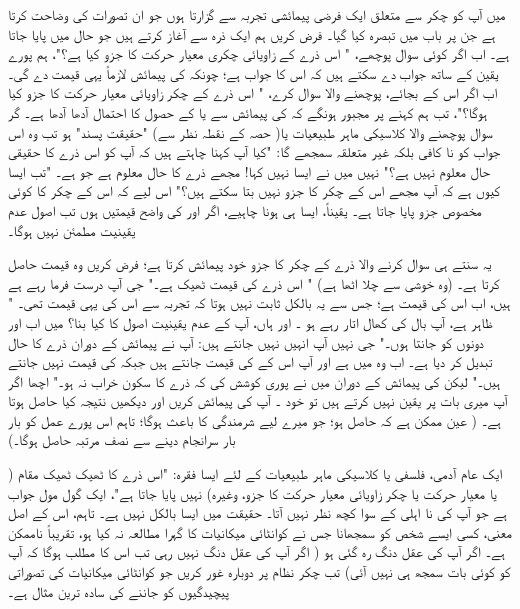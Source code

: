 میں آپ کو     چکر سے متعلق ایک فرضی  پیمائشی  تجربہ  سے گزارتا ہوں جو  ان تصورات  کی وضاحت کرتا ہے جن پر باب   میں  تبصرہ  کیا گیا۔ فرض کریں ہم  ایک ذرہ سے آغاز کرتے ہیں جو   حال میں پایا جاتا ہے۔ اب اگر کوئی سوال  پوچھے، " اس ذرے کے  زاویائی چکری معیار حرکت کا     جزو  کیا ہے؟"،   ہم پورے یقین کے ساتھ جواب دے سکتے ہیں کہ اس کا جواب   
    ہے؛  چونکہ    کی پیمائش  لازماً  یہی قیمت دے گی۔اب اگر  اس کے بجائے،  پوچھنے والا سوال کرے، " اس ذرے کے  چکر    زاویائی معیار حرکت کا    جزو  کیا ہوگا؟"،  تب ہم  کہنے پر مجبور ہونگے کہ     کی پیمائش سے       یا     کے حصول کا احتمال آدھا آدھا ہے۔ گر  سوال پوچھنے والا کلاسیکی ماہر  طبیعیات       
 یا( حصہ  کے نقطہ نظر  سے)  "حقیقت پسند"  ہو تب  وہ اس جواب کو نا کافی بلکہ غیر متعلقہ  سمجھے گا:  "کیا آپ  کہنا چاہتے ہیں کہ آپ کو اس ذرے کا حقیقی حال معلوم نہیں ہے؟"  نہیں میں نے ایسا  نہیں کہا!  مجھے ذرے کا حال    معلوم ہے جو     ہے۔ "تب ایسا کیوں ہے کہ آپ مجھے اس کے چکر کا  جزو  نہیں بتا سکتے ہیں؟"  اس لیے کہ اس کے چکر کا کوئی مخصوص  جزو  پایا جاتا ہے۔ یقیناً، ایسا ہی ہونا چاہیے،   اگر    اور   کی واضح  قیمتیں     ہوں تب اصول عدم یقینیت مطمئن  نہیں ہوگا۔
 
  یہ سنتے ہی سوال کرنے والا ذرے کے چکر کا    جزو    خود پیمائش کرتا ہے؛   فرض کریں  وہ     قیمت حاصل کرتا ہے۔ (وہ خوشی  سے چلا اٹھا ہے) "  اس ذرے کی   
 قیمت ٹھیک    ہے۔"  جی آپ درست فرما  رہے ہے  ہیں،  اب اس کی   قیمت ہے؛ جس سے یہ بالکل ثابت نہیں ہوتا کہ تجربہ سے   اس کی یہی قیمت تھی۔ " ظاہر ہے، آپ  بال کی کھال اتار رہے ہو ۔ اور ہاں،   آپ کے عدم یقینیت اصول کا کیا بنا؟  میں اب     اور       دونوں کو جانتا ہوں۔"  جی نہیں آپ انہیں نہیں  جانتے   ہیں:  آپ نے پیمائش کے دوران ذرے کا حال تبدیل کر دیا ہے۔ اب وہ     میں ہے    اور    آپ اس کے   کی قیمت جانتے ہیں جبکہ     کی قیمت  نہیں جانتے ہیں۔" لیکن       کی پیمائش کے دوران میں  نے پوری کوشش  کی کہ  ذرے کا سکون   خراب   نہ  ہو۔" اچھا اگر آپ میری بات پر یقین نہیں کرتے ہیں  تو خود ۔ آپ   کی پیمائش کریں اور دیکھیں نتیجہ کیا حاصل ہوتا ہے۔ ( عین ممکن ہے
  کہ    حاصل ہو؛  جو میرے لیے شرمندگی کا باعث  ہوگا؛ تاہم  اس پورے عمل کو بار بار  سرانجام دینے سے   نصف   مرتبہ     حاصل ہوگا۔)
  
   ایک عام آدمی،  فلسفی  یا   کلاسیکی ماہر طبیعیات کے لئے ایسا فقرہ:  "اس ذرے  کا ٹھیک ٹھیک مقام ( یا معیار حرکت یا چکر زاویائی معیار حرکت کا   جزو،  وغیرہ)  نہیں پایا جاتا ہے"،   ایک گول مول جواب ہے  جو آپ کی نا اہلی کے سوا کچھ نظر نہیں آتا۔ حقیقت میں ایسا بالکل   نہیں ہے۔ تاہم، اس کے  اصل معنی، کسی ایسے شخص کو سمجھانا جس نے کوانٹائی میکانیات کا گہرا  مطالعہ نہ کیا ہو، تقریباً  ناممکن ہے۔ اگر آپ کی عقل  دنگ رہ گئی ہو  (  اگر آپ کی عقل دنگ نہیں رہی تب اس کا مطلب ہوگا کہ آپ کو کوئی بات سمجھ ہی نہیں آئی)   تب     چکر نظام پر  دوبارہ  غور کریں جو  کوانٹائی میکانیات کی   تصوراتی پیچیدگیوں  کو جاننے  کی سادہ ترین مثال ہے۔


